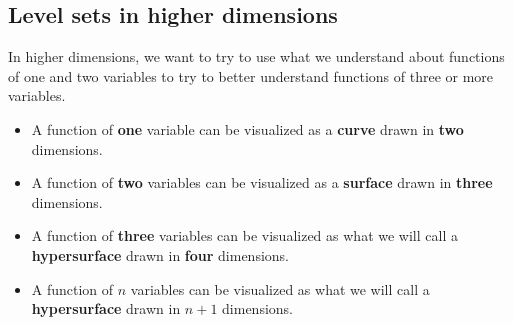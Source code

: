 \documentclass{ximera}
\begin{document}


\subsection{Level sets in higher dimensions}

In higher dimensions, we want to try to use what we understand about 
functions of one and two variables to try to better understand functions 
of three or more variables. 

\begin{itemize}
  \item A function of \textbf{one} variable can be visualized as a \textbf{curve} drawn
    in \textbf{two} dimensions.
  \item A function of \textbf{two} variables can be visualized as a \textbf{surface}
    drawn in \textbf{three} dimensions.
  \item A function of \textbf{three} variables can be visualized as what we will call a
    \textbf{hypersurface} drawn in \textbf{four} dimensions.
  \item A function of \textbf{$n$} variables can be visualized as what we will call a
    \textbf{hypersurface} drawn in \textbf{$n+1$} dimensions.
\end{itemize}
\end{document}
